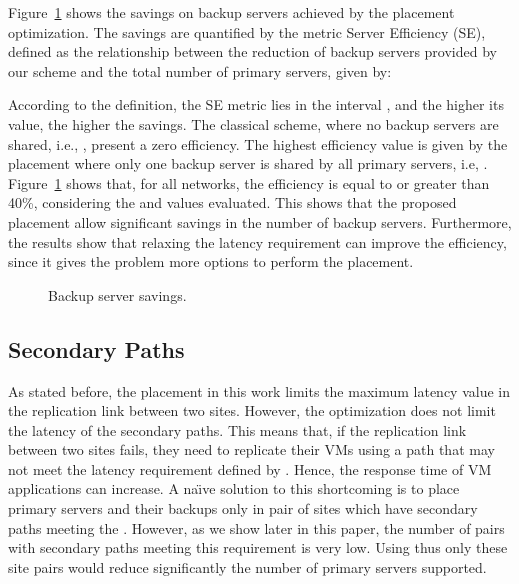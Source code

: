 \documentclass[preprint]{elsarticle}
\begin{document}
Figure~\ref{zeroRPOfig:ratioIaaSservers} shows the savings on backup servers achieved by the placement optimization. The savings are quantified by the metric Server Efficiency (SE), defined as the relationship between the reduction of backup servers provided by our scheme and the total number of primary servers, given by:


According to the definition, the SE metric lies in the interval , and the higher its value, the higher the savings. The classical scheme, where no backup servers are shared, i.e., , present a zero efficiency. The highest efficiency value is given by the placement where only one backup server is shared by all primary servers, i.e, . 
Figure~\ref{zeroRPOfig:ratioIaaSservers} shows that, for all networks, the efficiency is equal to or greater than 40\%, considering the  and  values evaluated. This shows that the proposed placement allow significant savings in the number of backup servers. Furthermore, the results show that relaxing the latency requirement can improve the efficiency, since it gives the problem more options to perform the placement. 
\begin{figure}[ht!]
\centering
{}
\caption{Backup server savings.}
\label{zeroRPOfig:ratioIaaSservers}
\end{figure}

\subsection{Secondary Paths}
\label{zeroRPOsubsec:caminhosSecundarios}

As stated before, the placement in this work limits the maximum latency value in the replication link between two sites. However, the optimization does not limit the latency of the secondary paths. This means that, if the replication link between two sites fails, they need to replicate their VMs using a path that may not meet the latency requirement defined by . Hence, the response time of VM applications can increase. A na\"{\i}ve solution to this shortcoming is to place primary servers and their backups only in pair of sites which have secondary paths meeting the . However, as we show later in this paper, the number of pairs with secondary paths meeting this requirement is very low. Using thus only these site pairs would reduce significantly the number of primary servers supported.
\end{document}
